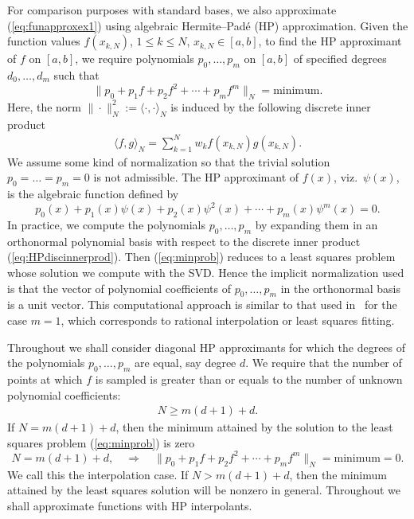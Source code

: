\documentclass{amsart}
\theoremstyle{remark}
\begin{document}
For comparison purposes with standard bases, we also approximate (\ref{eq:funapproxex1}) using algebraic Hermite--Pad\'e (HP) approximation. Given the function values $f(x_{k,N})$, $1 \leq k \leq N$, $x_{k,N} \in [a, b]$, to find the HP approximant of $f$ on $[a, b]$, we require polynomials  $p_0, \ldots, p_m$ on $[a,b]$ of specified degrees $d_0, \ldots, d_m$ such that 
\begin{equation}
\| p_0 + p_1 f + p_2 f^2 + \cdots + p_m f^m \|_{N} = \text{minimum}. \label{eq:minprob}
\end{equation}
Here, the norm $\| \cdot \|_N^2   := \langle \cdot, \cdot \rangle_{N}$ is induced by the following discrete inner product
\begin{align}
\langle f, g \rangle_{N} = \sum_{k = 1}^{N} w_k f(x_{k,N}) g(x_{k,N}).  \label{eq:HPdiscinnerprod}
\end{align} 
We assume some kind of normalization so that the trivial solution $p_0 = \ldots = p_m = 0$ is not admissible. The HP approximant of $f(x)$, viz.~$\psi(x)$, is the algebraic function defined by
\begin{equation}
p_0(x) + p_1(x) \psi(x) + p_2(x) \psi^2(x) + \cdots + p_m(x) \psi^m(x) = 0. \label{eq:psidef}
\end{equation} 
In practice, we compute the polynomials $p_0, \ldots, p_m$ by expanding them in an orthonormal polynomial basis with respect to the discrete inner product (\ref{eq:HPdiscinnerprod}). Then (\ref{eq:minprob}) reduces to a least squares problem whose solution we compute with the SVD. Hence the implicit normalization used is that the vector of polynomial coefficients of $p_0, \ldots, p_m$ in the orthonormal basis is a unit vector. This computational approach is similar to that used in~\cite{gonnet, pachon} for the case $m = 1$, which corresponds to rational interpolation or least squares fitting. 

Throughout we shall consider diagonal HP approximants for which the degrees of the polynomials $p_0, \ldots, p_m$ are equal, say degree $d$. We require that the number of points at which $f$ is sampled is greater than or equals to the number of unknown polynomial coefficients:
\begin{align*}
N \geq m(d+1) + d.
\end{align*}
If $N = m(d+1) + d$, then the minimum attained by the solution to the least squares problem (\ref{eq:minprob}) is zero
\begin{equation}
N = m(d+1)+d, \quad \Rightarrow \quad \| p_0 + p_1 f + p_2f^2 + \cdots + p_mf^m \|_{N} = \text{minimum} = 0. \label{eq:HPinterp}
\end{equation}
We call this the interpolation case. If $N > m(d+1) + d$, then the minimum attained by the least squares solution will be nonzero in general. Throughout we shall approximate functions with HP interpolants.
\end{document}
